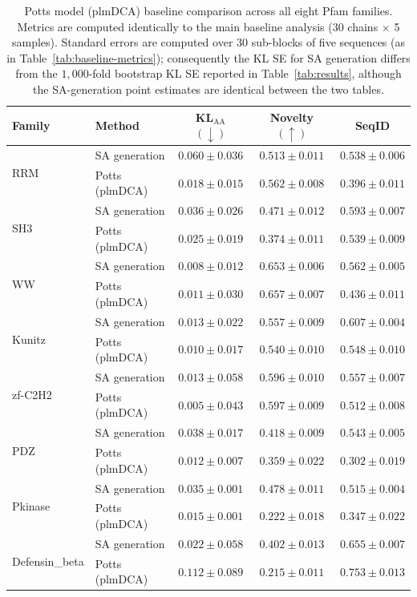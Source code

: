 \documentclass[10pt]{article}
\begin{document}
\begin{table}[ht]
\centering
\caption{Potts model (plmDCA) baseline comparison across all eight Pfam families. Metrics are computed identically to the main baseline analysis (30 chains $\times$ 5 samples). Standard errors are computed over $30$ sub-blocks of five sequences (as in Table~\ref{tab:baseline-metrics}); consequently the KL SE for SA generation differs from the $1{,}000$-fold bootstrap KL SE reported in Table~\ref{tab:results}, although the SA-generation point estimates are identical between the two tables.}
\label{tab:potts}
\small
\begin{tabular}{@{}llccc@{}}
\toprule
Family & Method & KL$_{\mathrm{AA}}$ $(\downarrow)$ & Novelty $(\uparrow)$ & SeqID \\
\midrule
\multirow{2}{*}{RRM}
 & SA generation    & $0.060 \pm 0.036$ & $0.513 \pm 0.011$ & $0.538 \pm 0.006$ \\
 & Potts (plmDCA)   & $0.018 \pm 0.015$ & $0.562 \pm 0.008$ & $0.396 \pm 0.011$ \\
\midrule
\multirow{2}{*}{SH3}
 & SA generation    & $0.036 \pm 0.026$ & $0.471 \pm 0.012$ & $0.593 \pm 0.007$ \\
 & Potts (plmDCA)   & $0.025 \pm 0.019$ & $0.374 \pm 0.011$ & $0.539 \pm 0.009$ \\
\midrule
\multirow{2}{*}{WW}
 & SA generation    & $0.008 \pm 0.012$ & $0.653 \pm 0.006$ & $0.562 \pm 0.005$ \\
 & Potts (plmDCA)   & $0.011 \pm 0.030$ & $0.657 \pm 0.007$ & $0.436 \pm 0.011$ \\
\midrule
\multirow{2}{*}{Kunitz}
 & SA generation    & $0.013 \pm 0.022$ & $0.557 \pm 0.009$ & $0.607 \pm 0.004$ \\
 & Potts (plmDCA)   & $0.010 \pm 0.017$ & $0.540 \pm 0.010$ & $0.548 \pm 0.010$ \\
\midrule
\multirow{2}{*}{zf-C2H2}
 & SA generation    & $0.013 \pm 0.058$ & $0.596 \pm 0.010$ & $0.557 \pm 0.007$ \\
 & Potts (plmDCA)   & $0.005 \pm 0.043$ & $0.597 \pm 0.009$ & $0.512 \pm 0.008$ \\
\midrule
\multirow{2}{*}{PDZ}
 & SA generation    & $0.038 \pm 0.017$ & $0.418 \pm 0.009$ & $0.543 \pm 0.005$ \\
 & Potts (plmDCA)   & $0.012 \pm 0.007$ & $0.359 \pm 0.022$ & $0.302 \pm 0.019$ \\
\midrule
\multirow{2}{*}{Pkinase}
 & SA generation    & $0.035 \pm 0.001$ & $0.478 \pm 0.011$ & $0.515 \pm 0.004$ \\
 & Potts (plmDCA)   & $0.015 \pm 0.001$ & $0.222 \pm 0.018$ & $0.347 \pm 0.022$ \\
\midrule
\multirow{2}{*}{Defensin\_beta}
 & SA generation    & $0.022 \pm 0.058$ & $0.402 \pm 0.013$ & $0.655 \pm 0.007$ \\
 & Potts (plmDCA)   & $0.112 \pm 0.089$ & $0.215 \pm 0.011$ & $0.753 \pm 0.013$ \\
\bottomrule
\end{tabular}
\end{table}
\end{document}
